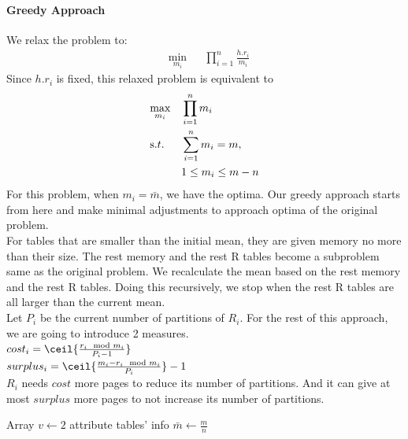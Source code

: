 \documentclass{vldb}
\begin{document}
\paragraph*{Greedy Approach}
We relax the problem to:
\begin{equation*}
\begin{aligned}
& \underset{m_i}{\text{min}}
& & \prod\limits_{i=1}^n \frac{h.r_i}{m_i}
\end{aligned}
\end{equation*}
Since $h.r_i$ is fixed, this relaxed problem is equivalent to
\begin{equation*}
\begin{aligned}
& \underset{m_i}{\text{max}}
& & \prod\limits_{i=1}^n {m_i} \\
& \text s.t.
& & \sum_{i=1}^n m_i = m, \\
&&& 1\le m_i\le m-n 
\end{aligned}
\end{equation*}
For this problem, when $m_i = \bar{m}$, we have the optima.
Our greedy approach starts from here and make minimal 
adjustments to approach optima of the original problem. \\
For tables that are smaller than the initial mean, 
they are given memory no more than their size. 
The rest memory and the rest R tables become a subproblem 
same as the original problem. We recalculate the mean based 
on the rest memory and the rest R tables. Doing this recursively, 
we stop when the rest R tables are all larger than the current mean. \\
Let $P_i$ be the current number of partitions of $R_i$. 
For the rest of this approach, we are going to introduce 2 measures. \\
$cost_i=\ceil{\frac{r_i\mod m_i}{P_i-1}}$ \\
$surplus_i=\ceil{\frac{m_i-r_i\mod m_i}{P_i}}-1$ \\
$R_i$ needs $cost$ more pages to reduce its number of partitions.
And it can give at most $surplus$ more pages to not increase its number of partitions.

\begin{algorithm}[t]
Array $v \leftarrow 2$ attribute tables' info
$\bar{m} \leftarrow \frac{m}{n}$ 


\end{algorithm}
\end{document}
